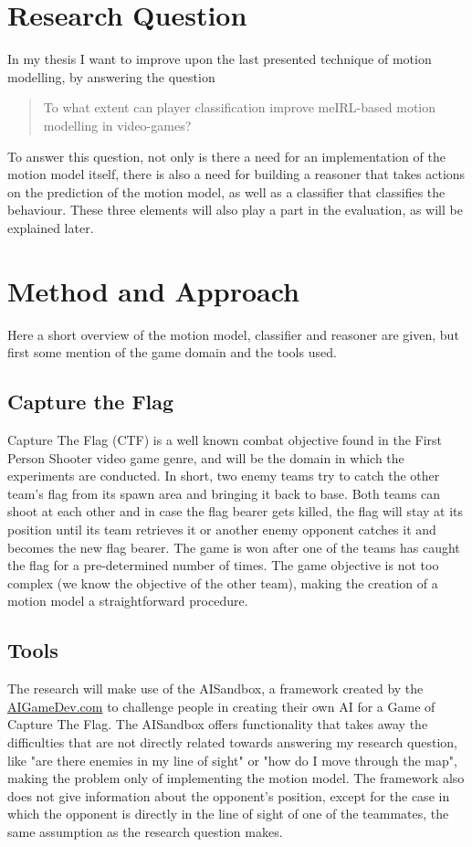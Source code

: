 \documentclass[a4paper, 12pt]{article}
\begin{document}
\section{Research Question}
In my thesis I want to improve upon the last presented technique of motion
modelling, by answering the question
\begin{quotation}
To what extent can player classification improve meIRL-based motion modelling in video-games?
\end{quotation}
To answer this question, not
only is there a need for an implementation of the motion model itself, there is
also a need for building a reasoner that takes actions on the prediction of the
motion model, as well as a classifier that classifies the behaviour. These three
elements will also play a part in the evaluation, as will be explained later.

\section{Method and Approach}
Here a short overview of the motion model, classifier and reasoner are given,
but first some mention of the game domain and the tools used.

\subsection{Capture the Flag}
Capture The Flag (CTF) is a well known combat objective found in the First
Person Shooter video game genre, and will be the domain in which the experiments
are conducted. In short, two enemy teams try to
catch the other team's flag from its spawn area and bringing it back to base.
Both teams can shoot at each other and in case the flag bearer gets killed, the
flag will stay at its position until its team retrieves it or another enemy
opponent catches it and becomes the new flag bearer. The game is won after one
of the teams has caught the flag for a pre-determined number of times.
The game objective is not too complex (we know the objective of the other team), making the
creation of a motion model a straightforward procedure.

\subsection{Tools}
The research will make use of the AISandbox, a framework created by the
\url{AIGameDev.com} to challenge people in creating their own AI for a Game of
Capture The Flag. The AISandbox offers functionality that takes away the
difficulties that are not directly related towards answering my research
question, like "are there enemies in my line of sight" or "how do I move through
the map", making the
problem only of implementing the motion model. The framework also does not
give information about the opponent's position, except for the case in which the
opponent is directly in the line of sight of one of the teammates, the same
assumption as the research question makes.
\end{document}
